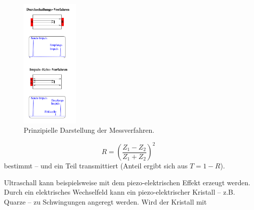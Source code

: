 \begin{figure}
	\centering
	\includegraphics[width=0.25\textwidth]{Bilder/Messverfahren.png}
	\caption{Prinzipielle Darstellung der Messverfahren. \cite{Anleitung}}
	\label{fig:echo}
\end{figure}
\begin{equation}
	R =(\frac{Z_1-Z_2}{Z_1+Z_2})^2
\end{equation}
bestimmt -- und ein Teil transmittiert (Anteil ergibt sich aus $T=1-R$).

Ultraschall kann beispielsweise mit dem piezo-elektrischen Effekt erzeugt werden.
Durch ein elektrisches Wechselfeld kann ein piezo-elektrischer Kristall -- z.B. Quarze -- zu
Schwingungen angeregt werden. Wird der Kristall mit
